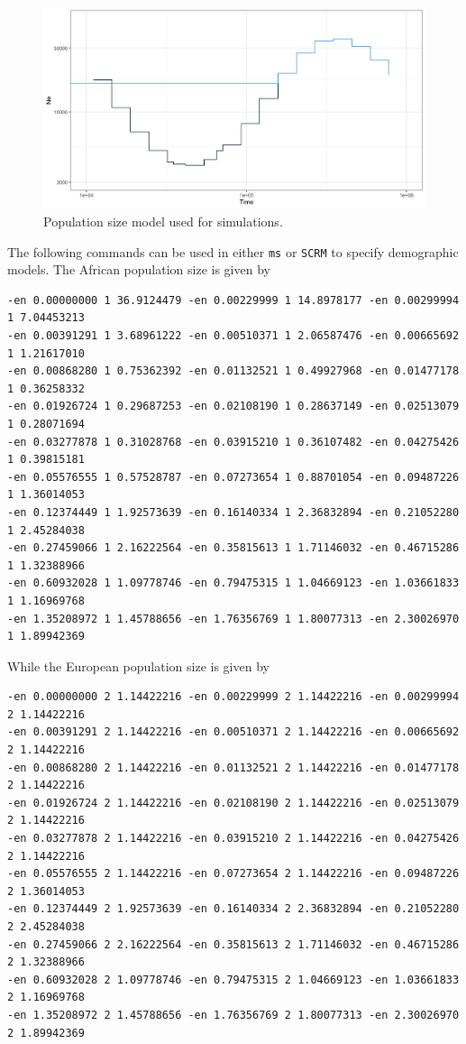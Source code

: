 \documentclass{article}
\begin{document}
\begin{figure}
    \centering
    \includegraphics[width = 0.5\linewidth]{../plot/demographic_model.png}
    \caption{Population size model used for simulations.}
    \label{fig:dem}
\end{figure}



The following commands can be used in either {\tt ms} or {\tt SCRM} to specify demographic models. The African population size is given by 

\begin{verbatim}
-en 0.00000000 1 36.9124479 -en 0.00229999 1 14.8978177 -en 0.00299994 1 7.04453213 
-en 0.00391291 1 3.68961222 -en 0.00510371 1 2.06587476 -en 0.00665692 1 1.21617010
-en 0.00868280 1 0.75362392 -en 0.01132521 1 0.49927968 -en 0.01477178 1 0.36258332
-en 0.01926724 1 0.29687253 -en 0.02108190 1 0.28637149 -en 0.02513079 1 0.28071694
-en 0.03277878 1 0.31028768 -en 0.03915210 1 0.36107482 -en 0.04275426 1 0.39815181
-en 0.05576555 1 0.57528787 -en 0.07273654 1 0.88701054 -en 0.09487226 1 1.36014053
-en 0.12374449 1 1.92573639 -en 0.16140334 1 2.36832894 -en 0.21052280 1 2.45284038
-en 0.27459066 1 2.16222564 -en 0.35815613 1 1.71146032 -en 0.46715286 1 1.32388966
-en 0.60932028 1 1.09778746 -en 0.79475315 1 1.04669123 -en 1.03661833 1 1.16969768
-en 1.35208972 1 1.45788656 -en 1.76356769 1 1.80077313 -en 2.30026970 1 1.89942369
\end{verbatim}

While the European population size is given by

\begin{verbatim}
-en 0.00000000 2 1.14422216 -en 0.00229999 2 1.14422216 -en 0.00299994 2 1.14422216
-en 0.00391291 2 1.14422216 -en 0.00510371 2 1.14422216 -en 0.00665692 2 1.14422216
-en 0.00868280 2 1.14422216 -en 0.01132521 2 1.14422216 -en 0.01477178 2 1.14422216
-en 0.01926724 2 1.14422216 -en 0.02108190 2 1.14422216 -en 0.02513079 2 1.14422216
-en 0.03277878 2 1.14422216 -en 0.03915210 2 1.14422216 -en 0.04275426 2 1.14422216
-en 0.05576555 2 1.14422216 -en 0.07273654 2 1.14422216 -en 0.09487226 2 1.36014053
-en 0.12374449 2 1.92573639 -en 0.16140334 2 2.36832894 -en 0.21052280 2 2.45284038 
-en 0.27459066 2 2.16222564 -en 0.35815613 2 1.71146032 -en 0.46715286 2 1.32388966
-en 0.60932028 2 1.09778746 -en 0.79475315 2 1.04669123 -en 1.03661833 2 1.16969768
-en 1.35208972 2 1.45788656 -en 1.76356769 2 1.80077313 -en 2.30026970 2 1.89942369
\end{verbatim}
\end{document}
